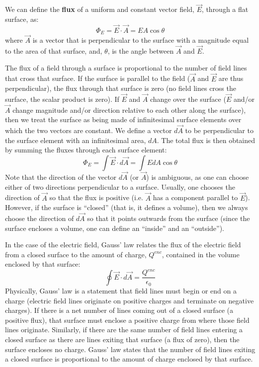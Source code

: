 We can define the \textbf{flux} of a uniform and constant vector field, $\vec E$, through a flat surface, as:
\begin{equation}
\Phi_E = \vec E \cdot \vec A = EA\cos\theta
\end{equation}
where $\vec A$ is a vector that is perpendicular to the surface with a magnitude equal to the area of that surface, and, $\theta$, is the angle between $\vec A$ and $\vec E$.

The flux of a field through a surface is proportional to the number of field lines that cross that surface. If the surface is parallel to the field ($\vec A$ and $\vec E$ are thus perpendicular), the flux through that surface is zero (no field lines cross the surface, the scalar product is zero). If $\vec E$ and $\vec A$ change over the surface ($\vec E$ and/or $\vec A$ change magnitude and/or direction relative to each other along the surface), then we treat the surface as being made of infinitesimal surface elements over which the two vectors are constant. We define a vector $d\vec A$ to be perpendicular to the surface element with an infinitesimal area, $dA$. The total flux is then obtained by summing the fluxes through each surface element:
\begin{equation}
\Phi_E=\int \vec E \cdot d\vec A=\int EdA\cos\theta
\end{equation}
Note that the direction of the vector $d\vec A$ (or $\vec A$) is ambiguous, as one can choose either of two directions perpendicular to a surface. Usually, one chooses the direction of $\vec A$ so that the flux is positive (i.e. $\vec A$ has a component parallel to $\vec E$). However, if the surface is ``closed'' (that is, it defines a volume), then we always choose the direction of $d\vec A$ so that it points outwards from the surface (since the surface encloses a volume, one can define an ``inside'' and an ``outside'').

In the case of the electric field, Gauss' law relates the flux of the electric field from a closed surface to the amount of charge, $Q^{enc}$, contained in the volume enclosed by that surface:
\begin{equation}
\oint \vec E \cdot d\vec A = \frac{Q^{enc}}{\epsilon_0}
\end{equation}
Physically, Gauss' law is a statement that field lines must begin or end on a charge (electric field lines originate on positive charges and terminate on negative charges). If there is a net number of lines coming out of a closed surface (a positive flux), that surface must enclose a positive charge from where those field lines originate. Similarly, if there are the same number of field lines entering a closed surface as there are lines exiting that surface (a flux of zero), then the surface encloses no charge. Gauss' law states that the number of field lines exiting a closed surface is proportional to the amount of charge enclosed by that surface.

